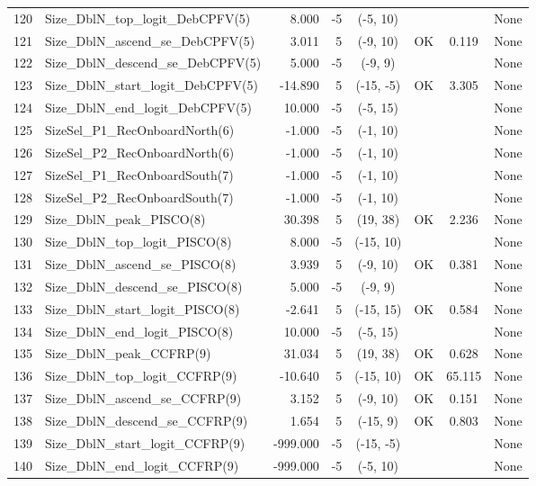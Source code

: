 \documentclass[12pt,]{article}
\begin{document}
\begin{landscape}
\begin{longtable}{rlrrcccl}
  120 & Size\_DblN\_top\_logit\_DebCPFV(5) & 8.000 & -5 & (-5, 10) &  &  & None \\ 
  121 & Size\_DblN\_ascend\_se\_DebCPFV(5) & 3.011 & 5 & (-9, 10) & OK & 0.119 & None \\ 
  122 & Size\_DblN\_descend\_se\_DebCPFV(5) & 5.000 & -5 & (-9, 9) &  &  & None \\ 
  123 & Size\_DblN\_start\_logit\_DebCPFV(5) & -14.890 & 5 & (-15, -5) & OK & 3.305 & None \\ 
  124 & Size\_DblN\_end\_logit\_DebCPFV(5) & 10.000 & -5 & (-5, 15) &  &  & None \\ 
  125 & SizeSel\_P1\_RecOnboardNorth(6) & -1.000 & -5 & (-1, 10) &  &  & None \\ 
  126 & SizeSel\_P2\_RecOnboardNorth(6) & -1.000 & -5 & (-1, 10) &  &  & None \\ 
  127 & SizeSel\_P1\_RecOnboardSouth(7) & -1.000 & -5 & (-1, 10) &  &  & None \\ 
  128 & SizeSel\_P2\_RecOnboardSouth(7) & -1.000 & -5 & (-1, 10) &  &  & None \\ 
  129 & Size\_DblN\_peak\_PISCO(8) & 30.398 & 5 & (19, 38) & OK & 2.236 & None \\ 
  130 & Size\_DblN\_top\_logit\_PISCO(8) & 8.000 & -5 & (-15, 10) &  &  & None \\ 
  131 & Size\_DblN\_ascend\_se\_PISCO(8) & 3.939 & 5 & (-9, 10) & OK & 0.381 & None \\ 
  132 & Size\_DblN\_descend\_se\_PISCO(8) & 5.000 & -5 & (-9, 9) &  &  & None \\ 
  133 & Size\_DblN\_start\_logit\_PISCO(8) & -2.641 & 5 & (-15, 15) & OK & 0.584 & None \\ 
  134 & Size\_DblN\_end\_logit\_PISCO(8) & 10.000 & -5 & (-5, 15) &  &  & None \\ 
  135 & Size\_DblN\_peak\_CCFRP(9) & 31.034 & 5 & (19, 38) & OK & 0.628 & None \\ 
  136 & Size\_DblN\_top\_logit\_CCFRP(9) & -10.640 & 5 & (-15, 10) & OK & 65.115 & None \\ 
  137 & Size\_DblN\_ascend\_se\_CCFRP(9) & 3.152 & 5 & (-9, 10) & OK & 0.151 & None \\ 
  138 & Size\_DblN\_descend\_se\_CCFRP(9) & 1.654 & 5 & (-15, 9) & OK & 0.803 & None \\ 
  139 & Size\_DblN\_start\_logit\_CCFRP(9) & -999.000 & -5 & (-15, -5) &  &  & None \\ 
  140 & Size\_DblN\_end\_logit\_CCFRP(9) & -999.000 & -5 & (-5, 10) &  &  & None \\ 

\end{longtable}
\end{landscape}
\end{document}
